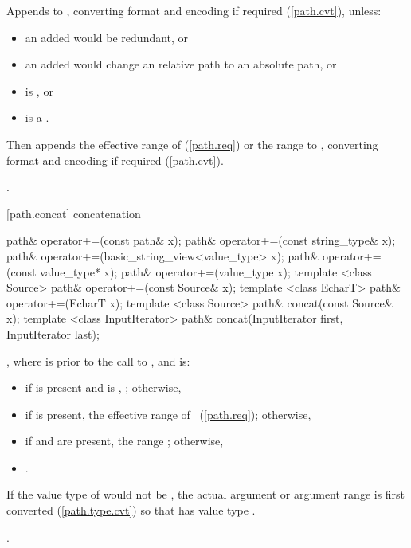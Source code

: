 \begin{itemdescr}
\pnum
\effects Appends  to ,
    converting format and encoding if required (\ref{path.cvt}), unless:
\begin{itemize}
\item an added  would be redundant, or
\item an added  would change an relative path to an absolute path, or
\item {} is , or
\item {} is a .
\end{itemize}
Then appends the effective range of  (\ref{path.req})
    or the range  to ,
    converting format and encoding if required (\ref{path.cvt}).

\pnum
\returns {}.
\end{itemdescr}

[path.concat]{ concatenation}

%
%
\begin{itemdecl}
path& operator+=(const path& x);
path& operator+=(const string_type& x);
path& operator+=(basic_string_view<value_type> x);
path& operator+=(const value_type* x);
path& operator+=(value_type x);
template <class Source>
  path& operator+=(const Source& x);
template <class EcharT>
  path& operator+=(EcharT x);
template <class Source>
  path& concat(const Source& x);
template <class InputIterator>
  path& concat(InputIterator first, InputIterator last);
\end{itemdecl}

\begin{itemdescr}
\pnum
\postcondition {},
 where  is  prior to the call to ,
 and  is:
 \begin{itemize}
\item if  is present and is ,
 ; otherwise,
\item if  is present,
 the effective range of ~(\ref{path.req}); otherwise,
\item if  and  are present,
 the range ; otherwise,
\item {}.
\end{itemize}
If the value type of  would not be ,
  the actual argument or argument range is first converted (\ref{path.type.cvt}) so that  has value type .

\pnum
\returns {}.
\end{itemdescr}

